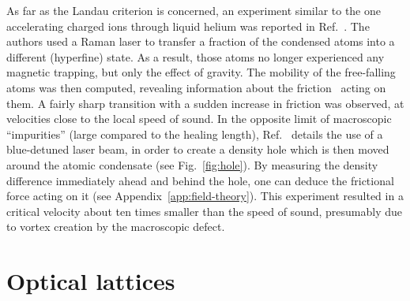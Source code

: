 % 
As far as the Landau criterion is concerned, an experiment similar to
the one accelerating charged ions through liquid helium was reported
in Ref.~\cite{Chikkatur_2000}. The authors used a Raman laser to
transfer a fraction of the condensed atoms into a different
(hyperfine) state. As a result, those atoms no longer experienced any
magnetic trapping, but only the effect of gravity. The mobility of the
free-falling atoms was then computed, revealing information about the
friction~\cite{Astrakharchik_2004} acting on them.  A fairly sharp
transition with a sudden increase in friction was observed, at
velocities close to the local speed of sound.
%
In the opposite limit of macroscopic ``impurities'' (large compared to
the healing length), Ref.~\cite{Onofrio_2000} details the use of a
blue-detuned laser beam, in order to create a density hole which is
then moved around the atomic condensate (see Fig.~\ref{fig:hole}).  By
measuring the density difference immediately ahead and behind the
hole, one can deduce the frictional force acting on it (see
Appendix~\ref{app:field-theory}). This experiment resulted in a
critical velocity about ten times smaller than the speed of sound,
presumably due to vortex creation by the macroscopic defect.


\section{Optical lattices}
\label{sec:optical-lattice}

